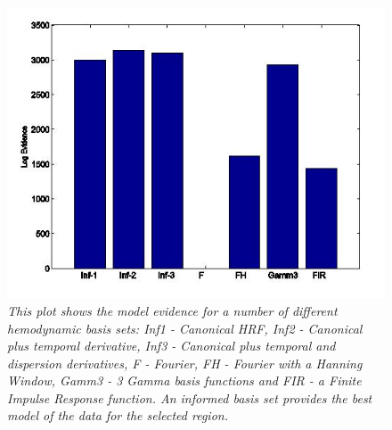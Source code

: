 \documentclass[a4paper,titlepage]{book}
\begin{document}
\begin{figure}
\includegraphics[width=150mm]{basis}
\caption{\em This plot shows the model evidence for a number 
of different hemodynamic basis sets: Inf1 - Canonical HRF, Inf2 - Canonical plus temporal derivative, Inf3 - Canonical plus 
temporal and dispersion derivatives, F - Fourier, FH - Fourier 
with a Hanning Window, Gamm3 - 3 Gamma basis functions and FIR - 
a Finite Impulse Response function. An informed basis set provides 
the best model of the data for the selected region.  \label{basis}}
\end{figure}

%



\end{document}

